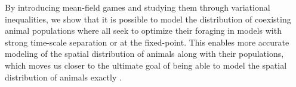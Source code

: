 By introducing mean-field games and studying them through variational inequalities, we show that it is possible to model the distribution of coexisting animal populations where all seek to optimize their foraging in models with strong time-scale separation or at the fixed-point. This enables more accurate modeling of the spatial distribution of animals along with their populations, which moves us closer to the ultimate goal of being able to model the spatial distribution of animals exactly \citep{morris2003shadows}.












